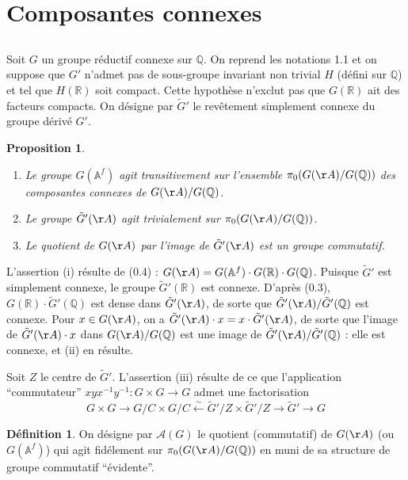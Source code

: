 \documentclass[11pt]{amsart}
\theoremstyle{plain}
\newtheorem{proposition}[theorem]{Proposition}
\theoremstyle{definition}
\newtheorem{definition}[theorem]{D\'efinition}
\newcommand{\QQ}{\mathbb{Q}}
\newcommand{\RR}{\mathbb{R}}
\newcommand{\AAf}{\mathbb{A}^f}
\begin{document}
\section{Composantes connexes}

\subsection{}

Soit $G$ un groupe r\'eductif connexe sur $\QQ$. On reprend les notations 1.1 et on suppose que $G'$ n'admet pas de sous-groupe invariant non trivial $H$ (d\'efini sur $\QQ$) et tel que $H(\RR)$ soit compact. Cette hypoth\`ese n'exclut pas que $G(\RR)$ ait des facteurs compacts. On d\'esigne par $\tilde{G}'$ le rev\^etement simplement connexe du groupe d\'eriv\'e $G'$.

\begin{proposition}
\begin{enumerate}
\item[(i)] Le groupe $G(\AAf)$ agit transitivement sur l'ensemble $\pi_0(G(\AA)/G(\QQ))$ des composantes connexes de $G(\AA)/G(\QQ)$.
\item[(ii)] Le groupe $\tilde{G}'(\AA)$ agit trivialement sur $\pi_0(G(\AA)/G(\QQ))$.
\item[(iii)] Le quotient de $G(\AA)$ par l'image de $\tilde{G}'(\AA)$ est un groupe commutatif.
\end{enumerate}
\end{proposition}

L'assertion (i) r\'esulte de (0.4) : $G(\AA) = G(\AAf) \cdot G(\RR) \cdot G(\QQ)$. Puisque $\tilde{G}'$ est simplement connexe, le groupe $\tilde{G}'(\RR)$ est connexe. D'apr\`es (0.3), $G(\RR) \cdot \tilde{G}'(\QQ)$ est dense dans $\tilde{G}'(\AA)$, de sorte que $\tilde{G}'(\AA)/\tilde{G}'(\QQ)$ est connexe. Pour $x \in G(\AA)$, on a $\tilde{G}'(\AA) \cdot x = x \cdot \tilde{G}'(\AA)$, de sorte que l'image de $\tilde{G}'(\AA) \cdot x$ dans $G(\AA)/G(\QQ)$ est une image de $\tilde{G}'(\AA)/\tilde{G}'(\QQ)$ : elle est connexe, et (ii) en r\'esulte.

Soit $Z$ le centre de $\tilde{G}'$. L'assertion (iii) r\'esulte de ce que l'application ``commutateur'' $x y x^{-1} y^{-1} : G \times G \longrightarrow G$ admet une factorisation
\[
G \times G \longrightarrow G/C \times G/C \xleftarrow{\sim} \tilde{G}'/Z \times \tilde{G}'/Z \longrightarrow \tilde{G}' \longrightarrow G
\]

\begin{definition}
On d\'esigne par $\mathcal{A}(G)$ le quotient (commutatif) de $G(\AA)$ (ou $G(\AAf)$) qui agit fid\'element sur $\pi_0(G(\AA)/G(\QQ))$ en muni de sa structure de groupe commutatif ``\'evidente''.
\end{definition}
\end{document}
